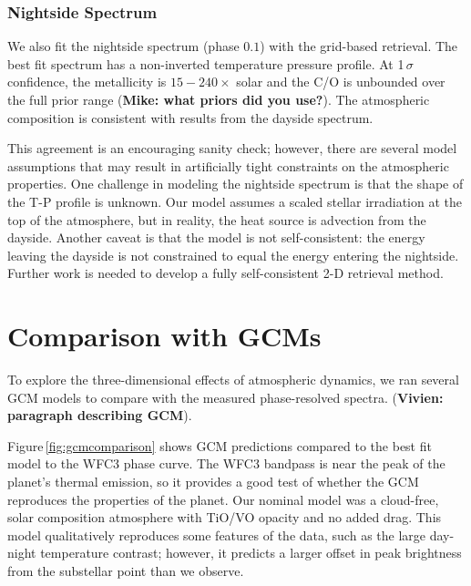 \documentclass[twocolumn]{aastex61}
\begin{document}
\subsubsection{Nightside Spectrum}
We also fit the nightside spectrum (phase $0.1$) with the grid-based retrieval. The best fit spectrum has a non-inverted temperature pressure profile.  At 1\,$\sigma$ confidence, the metallicity is $15 - 240\times$ solar and the C/O is unbounded over the full prior range (\textbf{Mike: what priors did you use?}). The atmospheric composition is consistent with results from the dayside spectrum. 

This agreement is an encouraging sanity check; however, there are several model assumptions that may result in artificially tight constraints on the atmospheric properties.  One challenge in modeling the nightside spectrum is that the shape of the T-P profile is unknown.  Our model assumes a scaled stellar irradiation at the top of the atmosphere, but in reality, the heat source is advection from the dayside. Another caveat is that the model is not self-consistent: the energy leaving the dayside is not constrained to equal the energy entering the nightside.  Further work is needed to develop a fully self-consistent 2-D retrieval method. 



\section{Comparison with GCMs}
\label{sec:gcm}
To explore the three-dimensional effects of atmospheric dynamics, we ran several GCM models to compare with the measured phase-resolved spectra. (\textbf{Vivien: paragraph describing GCM}).


Figure\,\ref{fig:gcmcomparison} shows GCM predictions compared to the best fit model to the WFC3 phase curve. The WFC3 bandpass is near the peak of the planet's thermal emission, so it provides a good test of whether the GCM reproduces the properties of the planet.  Our nominal model was a cloud-free, solar composition atmosphere with TiO/VO opacity and no added drag. This model qualitatively reproduces some features of the data, such as the large day-night temperature contrast; however, it predicts a larger offset in peak brightness from the substellar point than we observe. 
\end{document}
